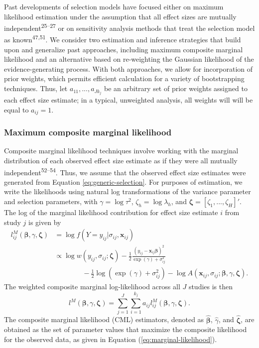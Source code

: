 \documentclass[
  american,
  man, donotrepeattitle,floatsintext]{apa7}
\begin{document}
Past developments of selection models have focused either on maximum likelihood estimation under the assumption that all effect sizes are mutually independent\textsuperscript{25--27} or on sensitivity analysis methods that treat the selection model as known\textsuperscript{47,51}. We consider two estimation and inference strategies that build upon and generalize past approaches, including maximum composite marginal likelihood and an alternative based on re-weighting the Gaussian likelihood of the evidence-generating process.
With both approaches, we allow for incorporation of prior weights, which permits efficient calculation for a variety of bootstrapping techniques.
Thus, let \(a_{11},...,a_{J k_j}\) be an arbitrary set of prior weights assigned to each effect size estimate; in a typical, unweighted analysis, all weights will will be equal to \(a_{ij} = 1\).

\subsubsection{Maximum composite marginal likelihood}\label{maximum-composite-marginal-likelihood}

Composite marginal likelihood techniques involve working with the marginal distribution of each observed effect size estimate as if they were all mutually independent\textsuperscript{52--54}.
Thus, we assume that the observed effect size estimates were generated from Equation \eqref{eq:generic-selection}.
For purposes of estimation, we write the likelihoods using natural log transformations of the variance parameter and selection parameters, with \(\gamma = \log \tau^2\), \(\zeta_h = \log \lambda_h\), and \(\boldsymbol\zeta = \left[\zeta_1,...,\zeta_H\right]'\).
The log of the marginal likelihood contribution for effect size estimate \(i\) from study \(j\) is given by
\begin{align}
l^M_{ij}\left(\boldsymbol\beta, \gamma, \boldsymbol\zeta \right) &= \log f\left(Y = y_{ij} | \sigma_{ij}, \mathbf{x}_{ij}\right) \nonumber \\
&\propto \log w\left(y_{ij}, \sigma_{ij}; \boldsymbol\zeta \right) - \frac{1}{2} \frac{\left(y_{ij} - \mathbf{x}_{ij} \boldsymbol\beta\right)^2}{\exp(\gamma) + \sigma_{ij}^2} \nonumber\\
& \qquad \qquad  - \frac{1}{2}\log\left(\exp(\gamma) + \sigma_{ij}^2\right) - \log A\left(\mathbf{x}_{ij}, \sigma_{ij}; \boldsymbol\beta, \gamma, \boldsymbol\zeta \right). \label{eq:log-like-ij}
\end{align}
The weighted composite marginal log-likelihood across all \(J\) studies is then
\begin{equation}
\label{eq:marginal-likelihood}
l^M\left(\boldsymbol\beta, \gamma, \boldsymbol\zeta\right) = \sum_{j=1}^J \sum_{i=1}^{k_j} a_{ij} l^M_{ij}\left(\boldsymbol\beta, \gamma, \boldsymbol\zeta\right).
\end{equation}
The composite marginal likelihood (CML) estimators, denoted as \(\boldsymbol{\hat\beta}\), \(\hat\gamma\), and \(\boldsymbol{\hat\zeta}\), are obtained as the set of parameter values that maximize the composite likelihood for the observed data, as given in Equation (\ref{eq:marginal-likelihood}).
\end{document}
